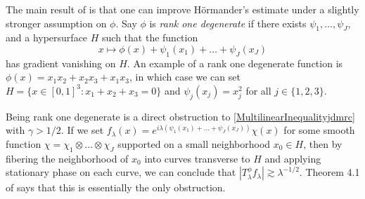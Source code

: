 \documentclass[12pt]{amsart}
\begin{document}
%
%
%
%
%
%
%
%
%

The main result of \cite{ChristTopicPaperjdmrc} is that one can improve H\"{o}rmander's estimate under a slightly stronger assumption on $\phi$. Say $\phi$ is \emph{rank one degenerate} if there exists $\psi_1,\dots,\psi_J$, and a hypersurface $H$ such that the function
%
\begin{equation}
    x \mapsto \phi(x) + \psi_1(x_1) + \dots + \psi_J(x_J)
\end{equation}
%
has gradient vanishing on $H$. An example of a rank one degenerate function is $\phi(x) = x_1x_2 + x_2x_3 + x_1x_3$, in which case we can set $H = \{ x \in [0,1]^3 : x_1 + x_2 + x_3 = 0 \}$ and $\psi_j(x_j) = x_j^2$ for all $j \in \{ 1, 2, 3 \}$.

Being rank one degenerate is a direct obstruction to \eqref{MultilinearInequalityjdmrc} with $\gamma > 1/2$. If we set $f_\lambda(x) = e^{i \lambda (\psi_1(x_1) + \dots + \psi_J(x_J))} \chi(x)$ for some smooth function $\chi = \chi_1 \otimes \dots \otimes \chi_J$ supported on a small neighborhood $x_0 \in H$, then by fibering the neighborhood of $x_0$ into curves transverse to $H$ and applying stationary phase on each curve, we can conclude that $|T^\phi_\lambda f_\lambda| \gtrsim \lambda^{-1/2}$. Theorem 4.1 of \cite{ChristTopicPaperjdmrc}  says that this is essentially the only obstruction.
\end{document}
